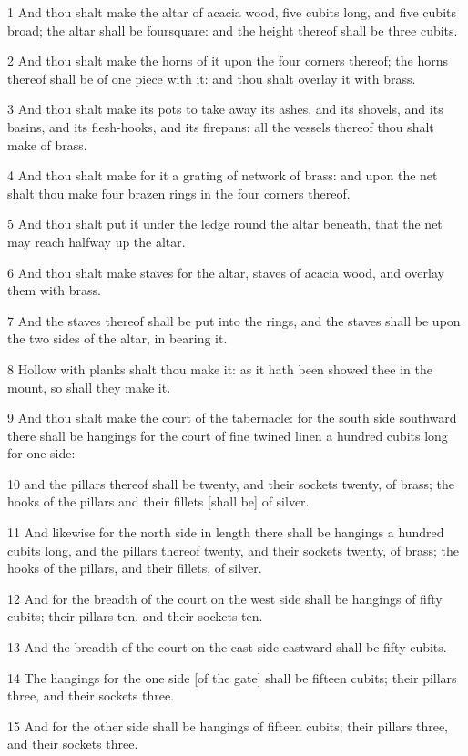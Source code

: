 \par 1 And thou shalt make the altar of acacia wood, five cubits long, and five cubits broad; the altar shall be foursquare: and the height thereof shall be three cubits.
\par 2 And thou shalt make the horns of it upon the four corners thereof; the horns thereof shall be of one piece with it: and thou shalt overlay it with brass.
\par 3 And thou shalt make its pots to take away its ashes, and its shovels, and its basins, and its flesh-hooks, and its firepans: all the vessels thereof thou shalt make of brass.
\par 4 And thou shalt make for it a grating of network of brass: and upon the net shalt thou make four brazen rings in the four corners thereof.
\par 5 And thou shalt put it under the ledge round the altar beneath, that the net may reach halfway up the altar.
\par 6 And thou shalt make staves for the altar, staves of acacia wood, and overlay them with brass.
\par 7 And the staves thereof shall be put into the rings, and the staves shall be upon the two sides of the altar, in bearing it.
\par 8 Hollow with planks shalt thou make it: as it hath been showed thee in the mount, so shall they make it.
\par 9 And thou shalt make the court of the tabernacle: for the south side southward there shall be hangings for the court of fine twined linen a hundred cubits long for one side:
\par 10 and the pillars thereof shall be twenty, and their sockets twenty, of brass; the hooks of the pillars and their fillets [shall be] of silver.
\par 11 And likewise for the north side in length there shall be hangings a hundred cubits long, and the pillars thereof twenty, and their sockets twenty, of brass; the hooks of the pillars, and their fillets, of silver.
\par 12 And for the breadth of the court on the west side shall be hangings of fifty cubits; their pillars ten, and their sockets ten.
\par 13 And the breadth of the court on the east side eastward shall be fifty cubits.
\par 14 The hangings for the one side [of the gate] shall be fifteen cubits; their pillars three, and their sockets three.
\par 15 And for the other side shall be hangings of fifteen cubits; their pillars three, and their sockets three.
